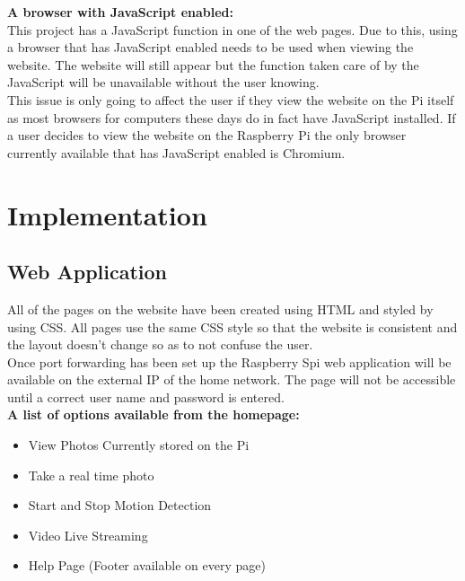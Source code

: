 \documentclass[12pt]{report}
\begin{document}
\noindent
{\bf A browser with JavaScript enabled:}\\
\break
This project has a JavaScript function in one of the web pages. Due to this, using a browser that has JavaScript enabled needs to be used when viewing the website. The website will still appear but the function taken care of by the JavaScript will be unavailable without the user knowing.\\

This issue is only going to affect the user if they view the website on the Pi itself as most browsers for computers these days do in fact have JavaScript installed. If a user decides to view the website on the Raspberry Pi the only browser currently available that has JavaScript enabled is Chromium.\\
%
%
\chapter{Implementation}
\label{ch:implem}
\section{Web Application}
\label{sec:webapp}
All of the pages on the website have been created using HTML and styled by using CSS. All pages use the same CSS style so that the website is consistent and the layout doesn't change so as to not confuse the user.\\

Once port forwarding has been set up the Raspberry Spi web application will be available on the external IP of the home network. The page will not be accessible until a correct user name and password is entered.\\

{\bf A list of options available from the homepage:}
\begin{itemize}
  \item View Photos Currently stored on the Pi\\
  \item Take a real time photo\\
  \item Start and Stop Motion Detection\\
  \item Video Live Streaming\\
  \item Help Page (Footer available on every page)\\
\end{itemize}
\end{document}
